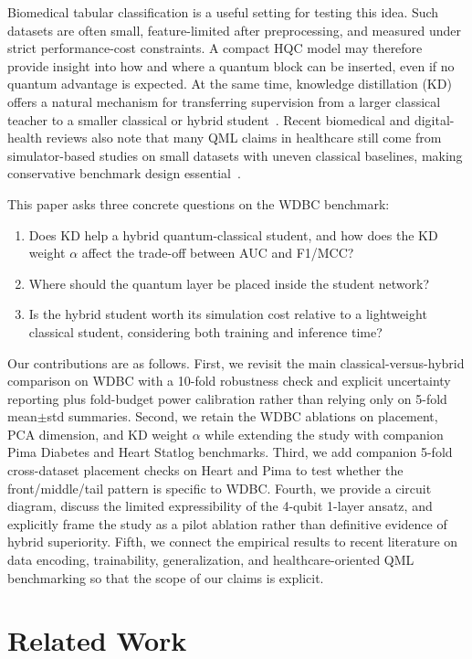 \documentclass[11pt,a4paper]{article}
\begin{document}
Biomedical tabular classification is a useful setting for testing this idea. Such datasets are often
small, feature-limited after preprocessing, and measured under strict performance-cost constraints.
A compact HQC model may therefore provide insight into how and where a quantum block can be inserted,
even if no quantum advantage is expected. At the same time, knowledge distillation (KD) offers a
natural mechanism for transferring supervision from a larger classical teacher to a smaller classical
or hybrid student~\cite{kd}. Recent biomedical and digital-health reviews also note that many QML
claims in healthcare still come from simulator-based studies on small datasets with uneven classical
baselines, making conservative benchmark design essential~\cite{maheshwari2022biomedical,gupta2025digitalhealth}.

This paper asks three concrete questions on the WDBC benchmark:
\begin{enumerate}
\item Does KD help a hybrid quantum-classical student, and how does the KD weight $\alpha$ affect the
trade-off between AUC and F1/MCC?
\item Where should the quantum layer be placed inside the student network?
\item Is the hybrid student worth its simulation cost relative to a lightweight classical student,
considering both training and inference time?
\end{enumerate}

Our contributions are as follows. First, we revisit the main classical-versus-hybrid comparison on
WDBC with a 10-fold robustness check and explicit uncertainty reporting plus fold-budget power
calibration rather than relying only on 5-fold mean$\pm$std summaries. Second, we retain the WDBC
ablations on placement, PCA dimension, and KD weight $\alpha$ while extending the study with
companion Pima Diabetes and Heart Statlog
benchmarks. Third, we add companion 5-fold cross-dataset placement checks on Heart and Pima to test
whether the front/middle/tail pattern is specific to WDBC. Fourth, we provide a circuit diagram, discuss the
limited expressibility of the 4-qubit 1-layer ansatz, and explicitly frame the study as a pilot
ablation rather than definitive evidence of hybrid superiority. Fifth, we connect the empirical
results to recent literature on data encoding, trainability, generalization, and healthcare-oriented
QML benchmarking so that the scope of our claims is explicit.

\section{Related Work}
\label{sec:rw}
\end{document}
